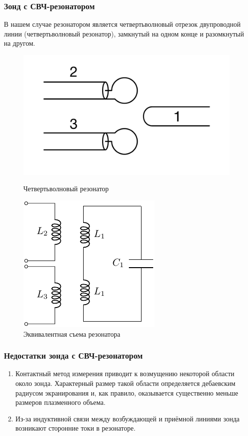 \documentclass[10pt,pdf,hyperref={unicode}, dvipsnames]{beamer}
\begin{document}
\begin{frame}
	\frametitle{Зонд с СВЧ-резонатором}
	В нашем случае резонатором является четвертьволновый отрезок двупроводной линии (четвертьволновый резонатор), замкнутый на одном конце и разомкнутый на другом. 
	\begin{figure}[H]
	\begin{minipage}{0.49\linewidth}
			\centering
			\includegraphics[width=\linewidth]{fig/resonator}
			\caption{Четвертьволновый резонатор}
			\label{fig:resonator}
	\end{minipage}
	\begin{minipage}{0.49\linewidth}		
			\centering
			\includegraphics[]{chem/chem1}
			\caption{Эквивалентная съема резонатора}
			\label{fig:chem1}
	\end{minipage}
	\end{figure}
\end{frame}

\begin{frame}
	\frametitle{Недостатки зонда с СВЧ-резонатором}
	\begin{enumerate}
		\item Контактный метод измерения приводит к возмущению некоторой области около зонда. Характерный размер такой области определяется дебаевским радиусом экранирования и, как правило, оказывается существенно меньше размеров плазменного объема.
		\item Из-за индуктивной связи между  возбуждающей и приёмной линиями зонда возникают сторонние токи в резонаторе.
	\end{enumerate}
\end{frame}
\end{document}
